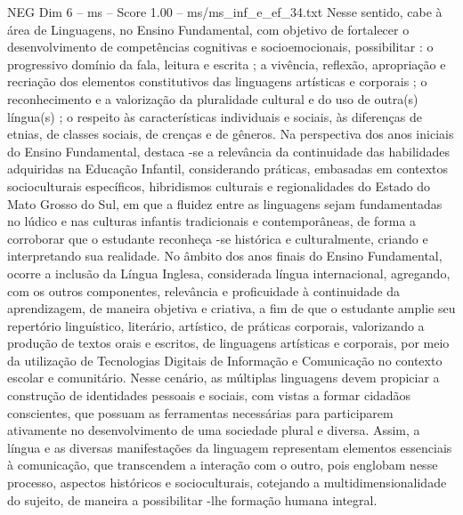 \begin{textsample}{NEG Dim 6 – ms – Score 1.00 – ms/ms\_inf\_e\_ef\_34.txt}
Nesse sentido, cabe à área de Linguagens, no Ensino Fundamental, com objetivo de fortalecer o desenvolvimento de competências cognitivas e socioemocionais, possibilitar : o progressivo domínio da fala, leitura e escrita ; a vivência, reflexão, apropriação e recriação dos elementos constitutivos das linguagens artísticas e corporais ; o reconhecimento e a valorização da pluralidade cultural e do uso de outra(s) língua(s) ; o respeito às características individuais e sociais, às diferenças de etnias, de classes sociais, de crenças e de gêneros.
Na perspectiva dos anos iniciais do Ensino Fundamental, destaca -se a relevância da continuidade das habilidades adquiridas na Educação Infantil, considerando práticas, embasadas em contextos socioculturais específicos, hibridismos culturais e regionalidades do Estado do Mato Grosso do Sul, em que a fluidez entre as linguagens sejam fundamentadas no lúdico e nas culturas infantis tradicionais e contemporâneas, de forma a corroborar que o estudante reconheça -se histórica e culturalmente, criando e interpretando sua realidade.
No âmbito dos anos finais do Ensino Fundamental, ocorre a inclusão da Língua Inglesa, considerada língua internacional, agregando, com os outros componentes, relevância e proficuidade à continuidade da aprendizagem, de maneira objetiva e criativa, a fim de que o estudante amplie seu repertório linguístico, literário, artístico, de práticas corporais, valorizando a produção de textos orais e escritos, de linguagens artísticas e corporais, por meio da utilização de Tecnologias Digitais de Informação e Comunicação no contexto escolar e comunitário.
Nesse cenário, as múltiplas linguagens devem propiciar a construção de identidades pessoais e sociais, com vistas a formar cidadãos conscientes, que possuam as ferramentas necessárias para participarem ativamente no desenvolvimento de uma sociedade plural e diversa.
Assim, a língua e as diversas manifestações da linguagem representam elementos essenciais à comunicação, que transcendem a interação com o outro, pois englobam nesse processo, aspectos históricos e socioculturais, cotejando a multidimensionalidade do sujeito, de maneira a possibilitar -lhe formação humana integral.

\end{textsample}
